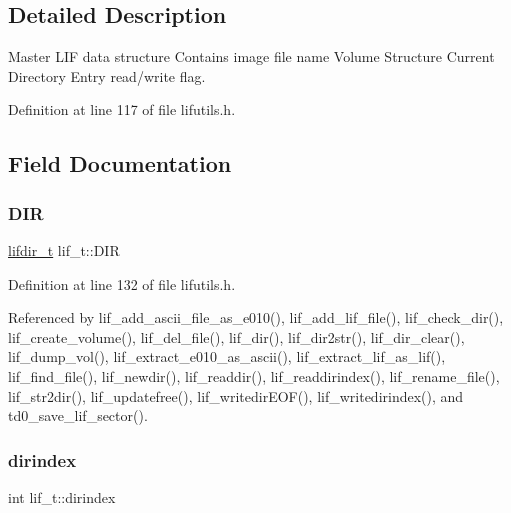 \subsection{Detailed Description}
Master L\+IF data structure Contains image file name Volume Structure Current Directory Entry read/write flag. 

Definition at line 117 of file lifutils.\+h.



\subsection{Field Documentation}
\mbox{\label{structlif__t_aefeaa526c04a2b8715b0392feeec52a3}} 
\subsubsection{\texorpdfstring{D\+IR}{DIR}}
{\footnotesize\ttfamily \hyperlink{structlifdir__t}{lifdir\+\_\+t} lif\+\_\+t\+::\+D\+IR}



Definition at line 132 of file lifutils.\+h.



Referenced by lif\+\_\+add\+\_\+ascii\+\_\+file\+\_\+as\+\_\+e010(), lif\+\_\+add\+\_\+lif\+\_\+file(), lif\+\_\+check\+\_\+dir(), lif\+\_\+create\+\_\+volume(), lif\+\_\+del\+\_\+file(), lif\+\_\+dir(), lif\+\_\+dir2str(), lif\+\_\+dir\+\_\+clear(), lif\+\_\+dump\+\_\+vol(), lif\+\_\+extract\+\_\+e010\+\_\+as\+\_\+ascii(), lif\+\_\+extract\+\_\+lif\+\_\+as\+\_\+lif(), lif\+\_\+find\+\_\+file(), lif\+\_\+newdir(), lif\+\_\+readdir(), lif\+\_\+readdirindex(), lif\+\_\+rename\+\_\+file(), lif\+\_\+str2dir(), lif\+\_\+updatefree(), lif\+\_\+writedir\+E\+O\+F(), lif\+\_\+writedirindex(), and td0\+\_\+save\+\_\+lif\+\_\+sector().

\mbox{\label{structlif__t_a74f8af3dc203c3c6b9dea3829bb4b6fa}} 
\subsubsection{\texorpdfstring{dirindex}{dirindex}}
{\footnotesize\ttfamily int lif\+\_\+t\+::dirindex}



